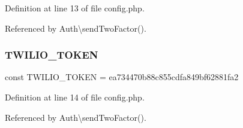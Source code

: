 Definition at line 13 of file config.\+php.



Referenced by Auth\textbackslash{}send\+Two\+Factor().

\hypertarget{config_8php_a0477d5c66524299f08cae7376eb7884c}{}\label{config_8php_a0477d5c66524299f08cae7376eb7884c} 
\subsubsection{\texorpdfstring{T\+W\+I\+L\+I\+O\+\_\+\+T\+O\+K\+EN}{TWILIO\_TOKEN}}
{\footnotesize\ttfamily const T\+W\+I\+L\+I\+O\+\_\+\+T\+O\+K\+EN = \textquotesingle{}ea734470b88c855cdfa849bf62881fa2\textquotesingle{}}



Definition at line 14 of file config.\+php.



Referenced by Auth\textbackslash{}send\+Two\+Factor().

